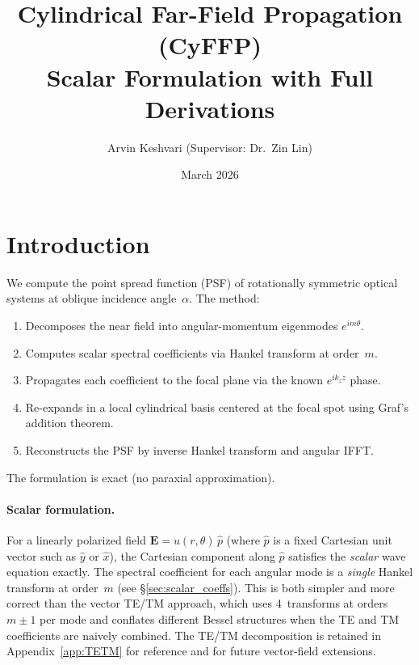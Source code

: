\documentclass[11pt,a4paper]{article}
\title{Cylindrical Far-Field Propagation (CyFFP)\\[6pt]
\large Scalar Formulation with Full Derivations}
\author{Arvin Keshvari \quad (Supervisor: Dr.\ Zin Lin)}
\date{March 2026}
\newcommand{\xhat}{\hat{x}}
\newcommand{\yhat}{\hat{y}}
\newcommand{\E}{\mathbf{E}}
\begin{document}
\maketitle
\tableofcontents
\newpage

\section{Introduction}

We compute the point spread function (PSF) of rotationally symmetric optical
systems at oblique incidence angle~$\alpha$.  The method:
\begin{enumerate}[nosep]
  \item Decomposes the near field into angular-momentum eigenmodes $e^{im\theta}$.
  \item Computes scalar spectral coefficients via Hankel transform at order~$m$.
  \item Propagates each coefficient to the focal plane via the known $e^{ik_z z}$ phase.
  \item Re-expands in a local cylindrical basis centered at the focal spot using
        Graf's addition theorem.
  \item Reconstructs the PSF by inverse Hankel transform and angular IFFT.
\end{enumerate}
The formulation is exact (no paraxial approximation).

\paragraph{Scalar formulation.}
For a linearly polarized field $\E = u(r,\theta)\,\hat p$ (where $\hat p$ is a
fixed Cartesian unit vector such as $\yhat$ or $\xhat$), the Cartesian component
along $\hat p$ satisfies the \emph{scalar} wave equation exactly.  The spectral
coefficient for each angular mode is a \emph{single} Hankel transform at order~$m$
(see \S\ref{sec:scalar_coeffs}).  This is both simpler and more correct than the
vector TE/TM approach, which uses 4~transforms at orders $m\pm 1$ per mode and
conflates different Bessel structures when the TE and TM coefficients are naively
combined.  The TE/TM decomposition is retained in Appendix~\ref{app:TETM} for
reference and for future vector-field extensions.


\end{document}
